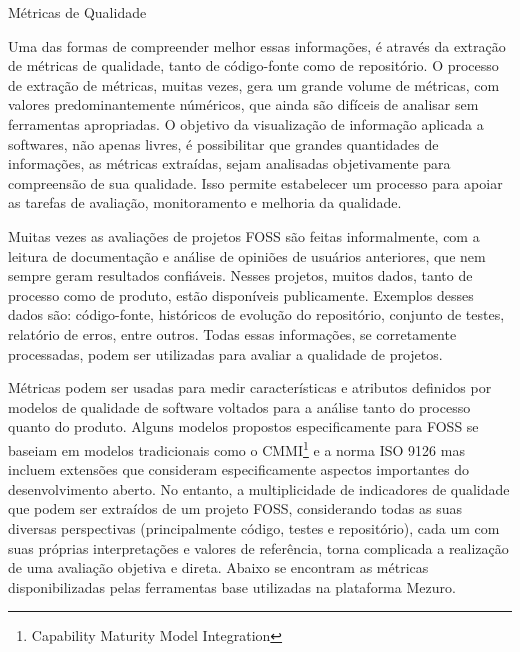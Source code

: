 
\begin{section}{Métricas de Qualidade}

Uma das formas de compreender melhor essas informações, é através da extração de métricas de qualidade, tanto de código-fonte como de repositório. O processo de extração de métricas, muitas vezes, gera um grande volume de métricas, com valores predominantemente núméricos, que ainda são difíceis de analisar sem ferramentas apropriadas. O objetivo da visualização de informação aplicada a softwares, não apenas livres, é possibilitar que grandes quantidades de informações, as métricas extraídas, sejam analisadas objetivamente para compreensão de sua qualidade. Isso permite estabelecer um processo para apoiar as tarefas de avaliação, monitoramento e melhoria da qualidade.

Muitas vezes as avaliações de projetos FOSS são feitas informalmente, com a leitura de documentação e análise de opiniões de usuários anteriores, que nem sempre geram resultados confiáveis. Nesses projetos, muitos dados, tanto de processo como de produto, estão disponíveis publicamente. Exemplos desses dados são: código-fonte, históricos de evolução do repositório, conjunto de testes, relatório de erros, entre outros. Todas essas informações, se corretamente processadas, podem ser utilizadas para avaliar a qualidade de projetos. 

Métricas podem ser usadas para medir características e atributos definidos por modelos de qualidade de software voltados para a análise tanto do processo quanto do produto. Alguns modelos propostos especificamente para FOSS se baseiam em modelos tradicionais como o CMMI\footnote{Capability Maturity Model Integration}\cite{paulk1994capability} e a norma ISO 9126\cite{iso2003iec} mas incluem extensões que consideram especificamente aspectos importantes do desenvolvimento aberto. No entanto, a multiplicidade de indicadores de qualidade que podem ser extraídos de um projeto FOSS, considerando todas as suas diversas perspectivas (principalmente código, testes e repositório), cada um com suas próprias interpretações e valores de referência, torna complicada a realização de uma avaliação objetiva e direta. Abaixo se encontram as métricas disponibilizadas pelas ferramentas base utilizadas na plataforma Mezuro.


\end{section}
